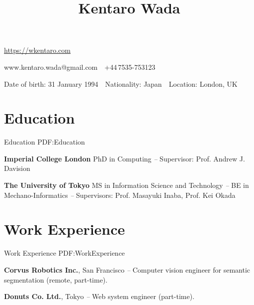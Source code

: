 \documentclass[letterpaper,MMMyyyy,nonstop]{simpleresumecv}
\newcommand{\CVAuthor}{Kentaro Wada}
\newcommand{\CVWebpage}{\href{https://wkentaro.com}{\underline{https://wkentaro.com}}}
\begin{document}

\title{\CVAuthor}

\begin{subtitle}
\CVWebpage
\par
www.kentaro.wada@gmail.com
\,\SubBulletSymbol\,
+44\,7535-753123
\par
Date of birth: 31 January 1994
\,\SubBulletSymbol\,
Nationality: Japan
\,\SubBulletSymbol\,
Location: London, UK

\noindent\makebox[\linewidth]{\rule{0.8\paperwidth}{0.4pt}}
\end{subtitle}

\begin{body}


\section
{Education}
{Education}
{PDF:Education}

\textbf{Imperial College London}
\newline
PhD in Computing
\hfill
{\it {} -- }
\newline
Supervisor: Prof. Andrew J. Davision

\GapNoBreak

\textbf{The University of Tokyo}
\newline
MS in Information Science and Technology
\hfill
{\it {} -- }
\newline
BE in Mechano-Informatics
\hfill
{\it {} -- }
\newline
Supervisors: Prof. Masayuki Inaba, Prof. Kei Okada



\section
{Work Experience}
{Work Experience}
{PDF:WorkExperience}

\textbf{Corvus Robotics Inc.}, San Francisco
\hfill
\textit{ -- }
\newline
Computer vision engineer for semantic segmentation (remote, part-time).

\textbf{Donuts Co. Ltd.}, Tokyo
\hfill
\textit{ -- }
\newline
Web system engineer (part-time).



\end{body}
\end{document}
